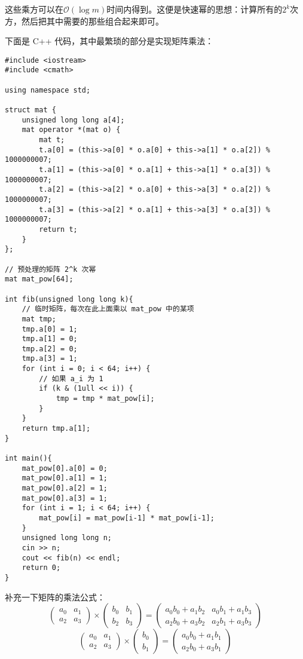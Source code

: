\documentclass[UTF8,12pt]{ctexart}
\begin{document}
这些乘方可以在$\mathcal{O}(\log m)$时间内得到。这便是快速幂的思想：计算所有的$2^k$次方，然后把其中需要的那些组合起来即可。

下面是 C++ 代码，其中最繁琐的部分是实现矩阵乘法：

\begin{lstlisting}
#include <iostream>
#include <cmath>

using namespace std;

struct mat {
    unsigned long long a[4];
    mat operator *(mat o) {
        mat t;
        t.a[0] = (this->a[0] * o.a[0] + this->a[1] * o.a[2]) % 1000000007;
        t.a[1] = (this->a[0] * o.a[1] + this->a[1] * o.a[3]) % 1000000007;
        t.a[2] = (this->a[2] * o.a[0] + this->a[3] * o.a[2]) % 1000000007;
        t.a[3] = (this->a[2] * o.a[1] + this->a[3] * o.a[3]) % 1000000007;
        return t;
    }
};

// 预处理的矩阵 2^k 次幂
mat mat_pow[64];

int fib(unsigned long long k){
    // 临时矩阵，每次在此上面乘以 mat_pow 中的某项
    mat tmp;
    tmp.a[0] = 1;
    tmp.a[1] = 0;
    tmp.a[2] = 0;
    tmp.a[3] = 1;
    for (int i = 0; i < 64; i++) {
        // 如果 a_i 为 1
        if (k & (1ull << i)) {
            tmp = tmp * mat_pow[i];
        }
    }
    return tmp.a[1];
}

int main(){
    mat_pow[0].a[0] = 0;
    mat_pow[0].a[1] = 1;
    mat_pow[0].a[2] = 1;
    mat_pow[0].a[3] = 1;
    for (int i = 1; i < 64; i++) {
        mat_pow[i] = mat_pow[i-1] * mat_pow[i-1];
    }
    unsigned long long n;
    cin >> n;
    cout << fib(n) << endl;
    return 0;
}    
\end{lstlisting}

补充一下矩阵的乘法公式：
\[\begin{pmatrix}a_0&a_1\\a_2&a_3\end{pmatrix}\times\begin{pmatrix}b_0&b_1\\b_2&b_3\end{pmatrix}=\begin{pmatrix}a_0b_0+a_1b_2&a_0b_1+a_1b_3\\a_2b_0+a_3b_2&a_2b_1+a_3b_3\end{pmatrix}\]
\[\begin{pmatrix}a_0&a_1\\a_2&a_3\end{pmatrix}\times\begin{pmatrix}b_0\\b_1\end{pmatrix}=\begin{pmatrix}a_0b_0+a_1b_1\\a_2b_0+a_3b_1\end{pmatrix}\]
\end{document}
